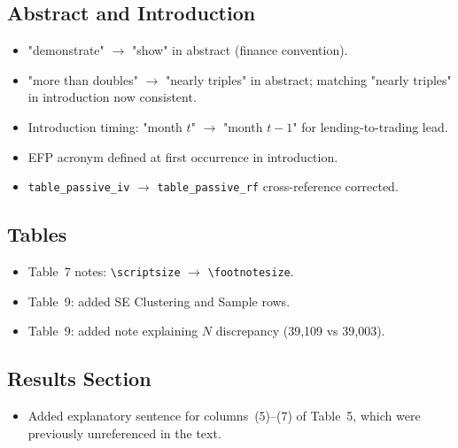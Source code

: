\documentclass[11pt, a4paper]{article}
\begin{document}
\subsection*{Abstract and Introduction}
\begin{itemize}[leftmargin=2em]
  \item[$\checkmark$] \textcolor{mingreen}{"demonstrate" $\to$ "show" in abstract (finance convention).}
  \item[$\checkmark$] \textcolor{mingreen}{"more than doubles" $\to$ "nearly triples" in abstract; matching "nearly triples" in introduction now consistent.}
  \item[$\checkmark$] \textcolor{mingreen}{Introduction timing: "month $t$" $\to$ "month $t-1$" for lending-to-trading lead.}
  \item[$\checkmark$] \textcolor{mingreen}{EFP acronym defined at first occurrence in introduction.}
  \item[$\checkmark$] \textcolor{mingreen}{\texttt{table\_passive\_iv} $\to$ \texttt{table\_passive\_rf} cross-reference corrected.}
\end{itemize}

\subsection*{Tables}
\begin{itemize}[leftmargin=2em]
  \item[$\checkmark$] \textcolor{mingreen}{Table~7 notes: \texttt{\textbackslash scriptsize} $\to$ \texttt{\textbackslash footnotesize}.}
  \item[$\checkmark$] \textcolor{mingreen}{Table~9: added SE Clustering and Sample rows.}
  \item[$\checkmark$] \textcolor{mingreen}{Table~9: added note explaining $N$ discrepancy (39,109 vs 39,003).}
\end{itemize}

\subsection*{Results Section}
\begin{itemize}[leftmargin=2em]
  \item[$\checkmark$] \textcolor{mingreen}{Added explanatory sentence for columns~(5)--(7) of Table~5, which were previously unreferenced in the text.}
\end{itemize}

\end{document}
